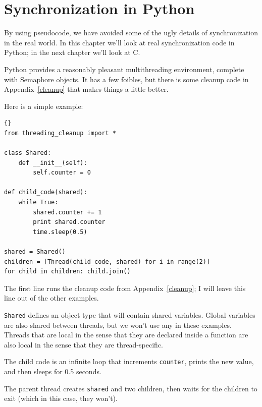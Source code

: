 \documentclass{book}
\begin{document}




\chapter{Synchronization in Python}
\label{pysync}

By using pseudocode, we have avoided some of the ugly
details of synchronization in the real world.  In this chapter
we'll look at real synchronization code in Python; in the
next chapter we'll look at C.

Python provides a reasonably pleasant multithreading environment,
complete with Semaphore objects.  It has
a few foibles, but there is some cleanup code in Appendix~\ref{cleanup}
that makes things a little better.

Here is a simple example:

\begin{latin}
\begin{lstlisting}[title={}]{}
from threading_cleanup import *

class Shared:
    def __init__(self):
        self.counter = 0

def child_code(shared):
    while True:
        shared.counter += 1
        print shared.counter
        time.sleep(0.5)

shared = Shared()
children = [Thread(child_code, shared) for i in range(2)]
for child in children: child.join()
\end{lstlisting}
\end{latin}

The first line runs the cleanup code from Appendix~\ref{cleanup};
I will leave this line out of the other examples.

{\tt Shared} defines an object type that will contain shared variables.
Global variables are also shared between threads, but we won't
use any in these examples.  Threads that are local in the sense
that they are declared inside a function are also local in the
sense that they are thread-specific.

The child code is an infinite loop that increments {\tt counter},
prints the new value, and then sleeps for 0.5 seconds.

The parent thread creates {\tt shared} and two children,
then waits for the children to exit (which in this case, they won't).
\end{document}
